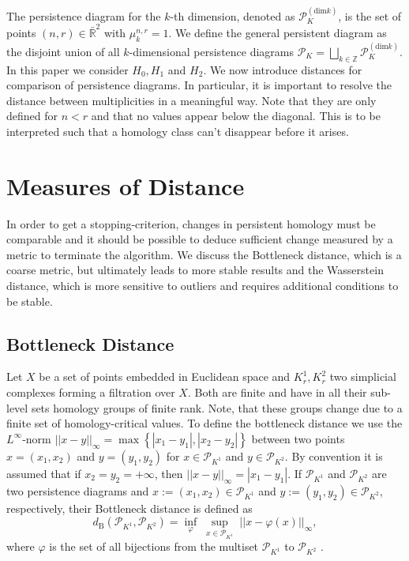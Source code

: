 \documentclass{article}
\begin{document}
The persistence diagram for the $k$-th dimension, denoted as $\mathcal{P}^{(\text{dim} k)}_{K}$, is the set of points $(n,r) \in \mathbb{\bar{R}}^2$ with $\mu^{n,r}_k = 1$. We define the general persistent diagram as the disjoint union of all $k$-dimensional persistence diagrams $\mathcal{P}_K = \bigsqcup_{k \in \mathbb{Z}} \mathcal{P}^{(\text{dim} k)}_{K}.$ In this paper we consider $H_0, H_1$ and $H_2$. We now introduce distances for comparison of persistence diagrams. In particular, it is important to resolve the distance between multiplicities in a meaningful way. Note that they are only defined for $n < r$ and that no values appear below the diagonal. This is to be interpreted such that a homology class can't disappear before it arises.

\section{Measures of Distance}
\label{sec:distances}
In order to get a stopping-criterion, changes in persistent homology must be comparable and it should be possible to deduce sufficient change measured by a metric to terminate the algorithm. We discuss the Bottleneck distance, which is a coarse metric, but ultimately leads to more stable results and the Wasserstein distance, which is more sensitive to outliers and requires additional conditions to be stable.

\subsection{Bottleneck Distance}
Let $X$ be a set of points embedded in Euclidean space and $K_{r}^1, K_{r}^2$ two simplicial complexes forming a filtration over $X$. Both are finite and have in all their sub-level sets homology groups of finite rank. Note, that these groups change due to a finite set of homology-critical values. To define the bottleneck distance we use the $L^\infty$-norm $||x-y||_\infty = \max\left\{|x_1-y_1|,|x_2-y_2|\right\}$ between two points $x = (x_1,x_2)$ and $y = (y_1,y_2)$ for $x \in \mathcal{P}_{K^1}$ and $y \in \mathcal{P}_{K^2}$. By convention it is assumed that if $x_2=y_2=+\infty$, then $||x-y||_\infty = |x_1-y_1|$. If $\mathcal{P}_{K^1}$ and $\mathcal{P}_{K^2}$ are two persistence diagrams and $x:=(x_1,x_2) \in \mathcal{P}_{K^1}$ and $y := (y_1,y_2)\in \mathcal{P}_{K^2}$, respectively, their Bottleneck distance is defined as
\begin{equation}
d_\text{B}(\mathcal{P}_{K^1},\mathcal{P}_{K^2})=\inf_{\varphi} \; \sup_{x\in \mathcal{P}_{K^1}}\;||x-\varphi(x)||_\infty,
\end{equation}
where $\varphi$ is the set of all bijections from the multiset $\mathcal{P}_{K^1}$ to $\mathcal{P}_{K^2}$ \cite{boissonnat2018geometric}.
\end{document}
